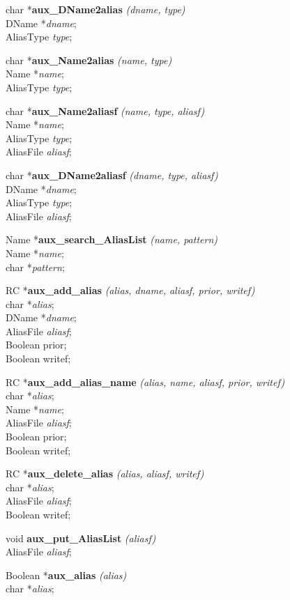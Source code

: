 char *{\bf aux\_DName2alias} {\em (dname, type)} \\
DName *{\em dname}; \\
AliasType {\em type}; 

char *{\bf aux\_Name2alias} {\em (name, type)} \\
Name *{\em name}; \\
AliasType {\em type}; 

char *{\bf aux\_Name2aliasf} {\em (name, type, aliasf)} \\
Name *{\em name}; \\
AliasType {\em type}; \\
AliasFile {\em aliasf};

char *{\bf aux\_DName2aliasf} {\em (dname, type, aliasf)} \\
DName *{\em dname}; \\
AliasType {\em type}; \\
AliasFile {\em aliasf};

Name *{\bf aux\_search\_AliasList} {\em (name, pattern)} \\
Name *{\em name}; \\
char *{\em pattern};

RC *{\bf aux\_add\_alias} {\em (alias, dname, aliasf, prior, writef)} \\
char *{\em alias}; \\ 
DName *{\em dname}; \\
AliasFile {\em aliasf}; \\
Boolean prior; \\
Boolean writef;

RC *{\bf aux\_add\_alias\_name} {\em (alias, name, aliasf, prior, writef)} \\
char *{\em alias}; \\ 
Name *{\em name}; \\
AliasFile {\em aliasf}; \\
Boolean prior; \\
Boolean writef;

RC *{\bf aux\_delete\_alias} {\em (alias, aliasf, writef)} \\
char *{\em alias}; \\
AliasFile {\em aliasf}; \\
Boolean writef;

void {\bf aux\_put\_AliasList} {\em (aliasf)} \\
AliasFile {\em aliasf}; 

Boolean *{\bf aux\_alias} {\em (alias)} \\
char *{\em alias}; 

